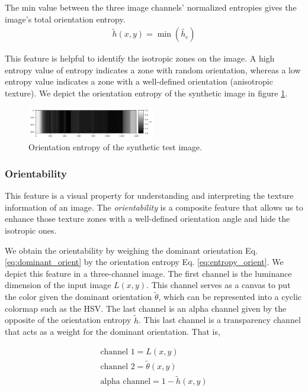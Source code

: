 \documentclass[journal]{IEEEtran}
\begin{document}
The min value between the three image channels' normalized entropies gives the image's total orientation entropy.
\begin{gather}
    \widetilde{h}(x,y) = \min(\widetilde{h_c}) \label{eq:entropy_orient}
\end{gather}

This feature is helpful to identify the isotropic zones on the image. A high entropy value of entropy indicates a zone with random orientation, whereas a low entropy value indicates a zone with a well-defined orientation (anisotropic texture). We depict the orientation entropy of the synthetic image in figure \ref{fig:entropy_orient_synth}.

\begin{figure}[!ht]
	\includegraphics[width=0.5\textwidth]{entropy_orient_synth}
    \caption{Orientation entropy of the synthetic test image.}
    \label{fig:entropy_orient_synth}
\end{figure}

\subsubsection{Orientability}
This feature is a visual property for understanding and interpreting the texture information of an image. The \textit{orientability} is a composite feature that allows us to enhance those texture zones with a well-defined orientation angle and hide the isotropic ones.

We obtain the orientability by weighing the dominant orientation Eq. \eqref{eq:dominant_orient} by the orientation entropy Eq. \eqref{eq:entropy_orient}. We depict this feature in a three-channel image. The first channel is the luminance dimension of the input image $L(x,y)$. This channel serves as a canvas to put the color given the dominant orientation $\widetilde{\theta}$, which can be represented into a cyclic colormap such as the HSV. The last channel is an alpha channel given by the opposite of the orientation entropy $\widetilde{h}$. This last channel is a transparency channel that acts as a weight for the dominant orientation. That is,

\begin{gather}
    \text{channel 1} = L(x,y) \\
    \text{channel 2} = \widetilde{\theta}(x,y) \\
    \text{alpha channel}= 1 - \widetilde{h}(x,y)
\end{gather}
\end{document}
